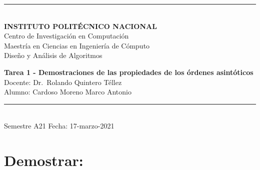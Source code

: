 \documentclass[letterpaper, 12pt]{article}
\begin{document}
\begin{titlepage}
\begin{center}
        \vspace*{2mm}
        \rule{\textwidth}{1.5pt}\\
        \vspace*{5mm}
        \textbf{\Large INSTITUTO POLITÉCNICO NACIONAL}\\
        \vspace*{8mm}
        {\Large Centro de Investigación en Computación}\\
        \vspace{8mm}
        {\Large Maestría en Ciencias en Ingeniería de Cómputo}\\
        \vspace{19mm}
        {\Large Diseño y Análisis de Algoritmos}\\
        \vspace{49mm}




        \textbf{\large Tarea 1 - Demostraciones de las propiedades de los órdenes asintóticos}\\





        \vspace*{48mm}
        {\large Docente: Dr.\ Rolando Quintero Téllez}\\
        \vspace*{20mm}
        {\large Alumno: Cardoso Moreno Marco Antonio}\\
        \vspace*{10mm}
        \rule{\textwidth}{1.5pt}\\
        {\large Semestre A21} \hfill {\large Fecha: 17-marzo-2021}
    \end{center}
\end{titlepage}

\newpage
\thispagestyle{empty}



%
%

\clearpage
{}

\section*{Demostrar:}
\label{sec:orgbe567fb}
\end{document}
